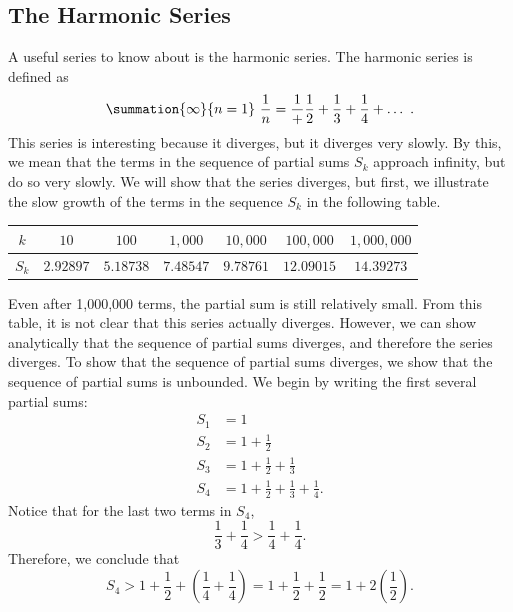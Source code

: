 \documentclass{report}
\begin{document}
    \subsection*{The Harmonic Series}
    \bigbreak \noindent 
    A useful series to know about is the harmonic series. The harmonic series is defined as
    \begin{align*}
        \summation{\infty}{n=1}\ \frac{1}{n}  = \frac{1} + \frac{1}{2} + \frac{1}{3} + \frac{1}{4} + \ldots\ 
    .\end{align*}
    This series is interesting because it diverges, but it diverges very slowly. By this, we mean that the terms in the sequence of partial sums \( S_k \) approach infinity, but do so very slowly. We will show that the series diverges, but first, we illustrate the slow growth of the terms in the sequence \( S_k \) in the following table.
    \bigbreak \noindent 
    \begin{center}
    \begin{tabular}{|c|c|c|c|c|c|c|}
        \hline
        $k$ & $10$ & $100$ & $1,000$ & $10,000$ & $100,000$ & $1,000,000$ \\
        \hline
        $S_k$ & $2.92897$ & $5.18738$ & $7.48547$ & $9.78761$ & $12.09015$ & $14.39273$ \\
        \hline
    \end{tabular}
    \end{center}
    \bigbreak \noindent 
    Even after 1,000,000 terms, the partial sum is still relatively small. From this table, it is not clear that this series actually diverges. However, we can show analytically that the sequence of partial sums diverges, and therefore the series diverges.
    \bigbreak \noindent 
    To show that the sequence of partial sums diverges, we show that the sequence of partial sums is unbounded. We begin by writing the first several partial sums:
    \bigbreak \noindent 
    \begin{align*}
        S_1 & = 1 \\
        S_2 & = 1 + \frac{1}{2} \\
        S_3 & = 1 + \frac{1}{2} + \frac{1}{3} \\
        S_4 & = 1 + \frac{1}{2} + \frac{1}{3} + \frac{1}{4}.
    \end{align*}
    Notice that for the last two terms in \( S_4 \),
    \[
    \frac{1}{3} + \frac{1}{4} > \frac{1}{4} + \frac{1}{4}.
    \]
    Therefore, we conclude that
    \[
    S_4 > 1 + \frac{1}{2} + \left( \frac{1}{4} + \frac{1}{4} \right) = 1 + \frac{1}{2} + \frac{1}{2} = 1 + 2 \left( \frac{1}{2} \right).
    \]
\end{document}
